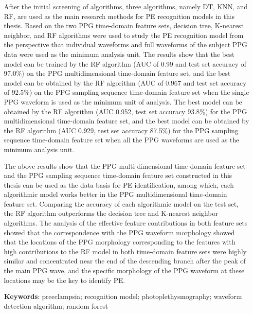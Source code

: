 After the initial screening of algorithms, three algorithms, namely DT, KNN, and RF, are used as the main research methods 
for PE recognition models in this thesis. Based on the two PPG time-domain feature sets, decision tree, K-nearest neighbor, and RF algorithms were 
used to study the PE recognition model from the perspective that individual waveforms and full waveforms of the subject PPG data were used as the minimum analysis unit. 
The results show that the best model can be trained by the RF algorithm (AUC of 0.99 and test set accuracy of 97.0\%) on the PPG multidimensional time-domain 
feature set, and the best model can be obtained by the RF algorithm (AUC of 0.967 and test set accuracy of 92.5\%) on the PPG sampling sequence time-domain 
feature set when the single PPG waveform is used as the minimum unit of analysis. The best model can be obtained by the RF algorithm (AUC 0.952, 
test set accuracy 93.8\%) for the PPG multidimensional time-domain feature set, and the best model can be obtained by the RF algorithm (AUC 0.929, 
test set accuracy 87.5\%) for the PPG sampling sequence time-domain feature set when all the PPG waveforms are used as the minimum analysis unit.

The above results show that the PPG multi-dimensional time-domain feature set and the PPG sampling sequence time-domain feature set constructed in this thesis 
can be used as the data basis for PE identification, among which, each algorithmic model works better in the PPG multidimensional time-domain feature set.
Comparing the accuracy of each algorithmic model on the test set, the RF algorithm outperforms 
the decision tree and K-nearest neighbor algorithms. The analysis of the effective feature contributions in both feature sets showed that the correspondence 
with the PPG waveform morphology showed that the locations of the PPG morphology corresponding to the features with high contributions to the RF 
model in both time-domain feature sets were highly similar and concentrated near the end of the descending branch after the peak of the main PPG wave, 
and the specific morphology of the PPG waveform at these locations may be the key to identify PE.

\vspace{2em}

\textbf{Keywords}: preeclampsia; recognition model; photoplethysmography; waveform detection algorithm; random forest